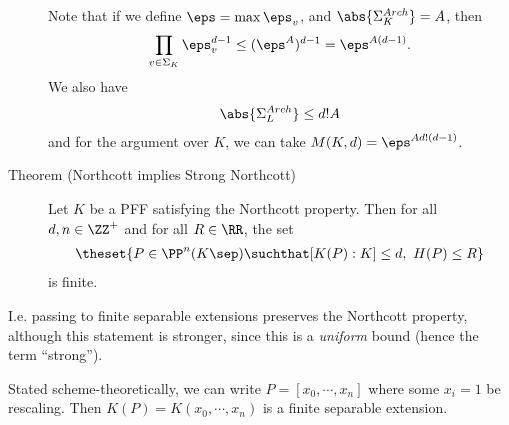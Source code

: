 \begin{description}
Note that if we define \(\eps = \max \eps_v\), and
\(\abs{\Sigma_K^{Arch}} = A\), then
\begin{align*}
\prod_{v\in \Sigma_K} \eps_v^{d-1} \leq (\eps^A)^{d-1} = \eps^{A(d-1)}
.\end{align*} We also have
\begin{align*}
\abs{\Sigma_L^{Arch}} \leq d! A
\end{align*} and for the argument over \(K\), we can take
\(M(K, d) = \eps^{A d!(d-1)}\).
\item[Theorem (Northcott implies Strong Northcott)]
Let \(K\) be a PFF satisfying the Northcott property. Then for all
\(d, n \in \ZZ^+\) and for all \(R\in \RR\), the set
\begin{align*}\theset{ P \in \PP^n(K\sep) \suchthat [K(P): K] \leq d,~ H(P) \leq R  }\end{align*}
is finite.
\end{description}

I.e. passing to finite separable extensions preserves the Northcott
property, although this statement is stronger, since this is a
\emph{uniform} bound (hence the term ``strong'').

Stated scheme-theoretically, we can write \(P = [x_0, \cdots, x_n]\)
where some \(x_i = 1\) be rescaling. Then \(K(P) = K(x_0, \cdots, x_n)\)
is a finite separable extension.

